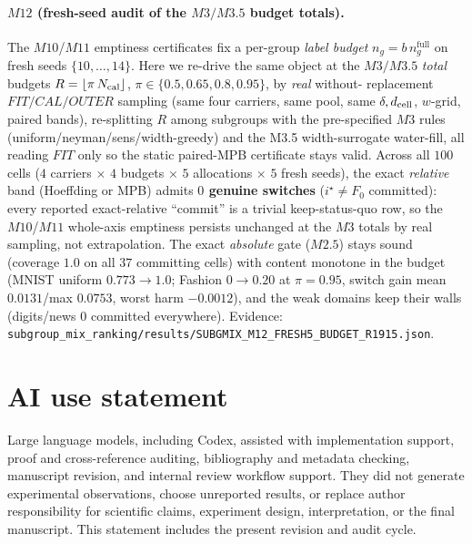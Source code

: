 \documentclass{article}
\begin{document}
\paragraph{$M12$ (fresh-seed audit of the $M3/M3.5$ budget totals).}
The $M10$/$M11$ emptiness certificates fix a per-group \emph{label budget} $n_g=b\,n_g^{\mathrm{full}}$
on fresh seeds $\{10,\dots,14\}$. Here we re-drive the same object at the $M3/M3.5$ \emph{total}
budgets $R=\lfloor\pi\,N_{\rm cal}\rfloor$, $\pi\in\{0.5,0.65,0.8,0.95\}$, by \emph{real} without-
replacement $FIT/CAL/OUTER$ sampling (same four carriers, same pool, same $\delta,d_{\rm cell}$,
$w$-grid, paired bands), re-splitting $R$ among subgroups with the pre-specified $M3$ rules
(uniform/neyman/sens/width-greedy) and the M3.5 width-surrogate water-fill, all reading $FIT$ only so
the static paired-MPB certificate stays valid. Across all $100$ cells
($4$ carriers $\times$ $4$ budgets $\times$ $5$ allocations $\times$ $5$ fresh seeds), the exact
\emph{relative} band (Hoeffding or MPB) admits \textbf{$0$ genuine switches} ($i^\star\!\ne\!F_0$
committed): every reported exact-relative ``commit'' is a trivial keep-status-quo row, so the $M10$/$
M11$ whole-axis emptiness persists unchanged at the $M3$ totals by real sampling, not extrapolation.
The exact \emph{absolute} gate ($M2.5$) stays sound (coverage $1.0$ on all $37$ committing cells) with
content monotone in the budget (MNIST uniform $0.773\!\to\!1.0$; Fashion $0\!\to\!0.20$ at $\pi{=}0.95$,
switch gain mean $0.0131$/max $0.0753$, worst harm $-0.0012$), and the weak domains keep their walls
(digits/news $0$ committed everywhere). Evidence:
\texttt{subgroup\_mix\_ranking/results/SUBGMIX\_M12\_FRESH5\_BUDGET\_R1915.json}.

\section{AI use statement}
Large language models, including Codex, assisted with implementation support, proof and
cross-reference auditing, bibliography and metadata checking, manuscript revision, and
internal review workflow support. They did not generate experimental observations, choose
unreported results, or replace author responsibility for scientific claims, experiment design,
interpretation, or the final manuscript. This statement includes the present revision and
audit cycle.
\end{document}
